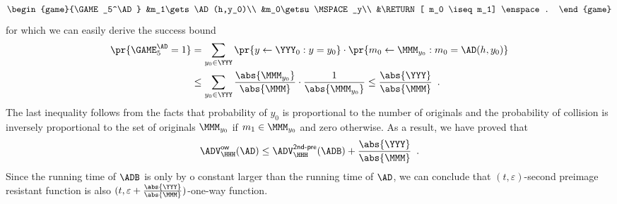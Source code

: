 \documentclass{crypto-exercise}
\newcommand{\ADVOW}[2]{\ADV^{\mathsf{ow}}_{#1}(#2)}
\newcommand{\ADVSPRE}[2]{\ADV^{\mathsf{2nd\text{-}pre}}_{#1}(#2)}
\begin{document}
\begin{solution}
\begin{align*}
\begin{game}{\GAME_5^\AD}
 &m_1\gets \AD(h,y_0)\\
 &m_0\getsu\MSPACE_y\\
 &\RETURN [ m_0 \iseq m_1] \enspace.
\end{game}      
\end{align*}
for which we can easily derive the success bound 
\begin{align*}
\pr{\GAME_5^\AD=1}&= \sum_{y_0\in\YYY}\pr{y\gets\YYY_0:y=y_0}\cdot\pr{m_0\gets\MMM_{y_0}: m_0=\AD(h,y_0)}\\
 &\leq \sum_{y_0\in\YYY}\frac{\abs{\MMM_{y_0}}}{\abs{\MMM}}\cdot \frac{1}{\abs{\MMM_{y_0}}}\leq  \frac{\abs{\YYY}}{\abs{\MMM}}\enspace.
\end{align*}
The last inequality follows from the facts that probability of $y_0$ is proportional to the number of originals and the probability of collision is inversely proportional to the set of originals $\MMM_{y_0}$ if $m_1\in\MMM_{y_0}$ and zero otherwise. As a result, we have proved that
\begin{align*}
\ADVOW{\HHH}{\AD} \leq \ADVSPRE{\HHH}{\ADB} + \frac{\abs{\YYY}}{\abs{\MMM}}\enspace.
\end{align*}
Since the running time of $\ADB$ is only by o constant larger than the running time of $\AD$, we can conclude that $(t,\varepsilon)$-second preimage resistant function is also $(t,\varepsilon+\frac{\abs{\YYY}}{\abs{\MMM}})$-one-way function. 


\end{solution}
\end{document}
